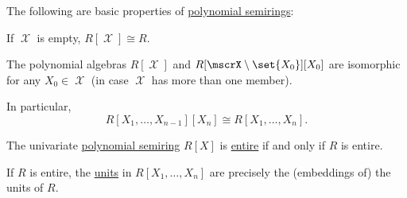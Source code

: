 \begin{proposition}\label{thm:def:polynomial_algebra}
  The following are basic properties of \hyperref[def:polynomial_algebra]{polynomial semirings}:
  \begin{thmenum}
     If \( \mscrX \) is empty, \( R[\mscrX] \cong R \).

     The polynomial algebras \( R[\mscrX] \) and \( R[\mscrX \setminus \set{ X_0 }][X_0] \) are isomorphic for any \( X_0 \in \mscrX \) (in case \( \mscrX \) has more than one member).

    In particular,
    \begin{equation*}
      R[X_1, \ldots, X_{n-1}][X_n] \cong R[X_1, \ldots, X_n].
    \end{equation*}

     The univariate \hyperref[def:polynomial_algebra]{polynomial semiring} \( R[X] \) is \hyperref[def:entire_semiring]{entire} if and only if \( R \) is entire.

     If \( R \) is entire, the \hyperref[def:divisibility/unit]{units} in \( R[X_1, \ldots, X_n] \) are precisely the (embeddings of) the units of \( R \).
  \end{thmenum}
\end{proposition}
